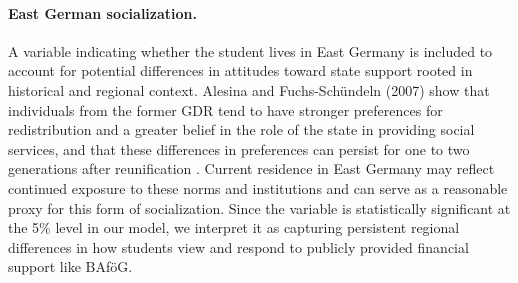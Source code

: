\paragraph{East German socialization.}  A variable indicating whether the student lives in East Germany is included to account for potential differences in attitudes toward state support rooted in historical and regional context. Alesina and Fuchs-Schündeln (2007) show that individuals from the former GDR tend to have stronger preferences for redistribution and a greater belief in the role of the state in providing social services, and that these differences in preferences can persist for one to two generations after reunification \citep{alesina_good-bye_2007}. Current residence in East Germany may reflect continued exposure to these norms and institutions and can serve as a reasonable proxy for this form of socialization. Since the variable is statistically significant at the 5\% level in our model, we interpret it as capturing persistent regional differences in how students view and respond to publicly provided financial support like BAföG.
